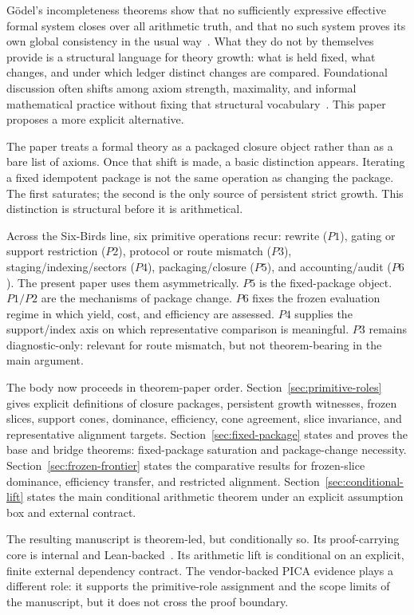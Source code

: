 \documentclass[11pt]{article}
\begin{document}
G\"odel's incompleteness theorems show that no sufficiently expressive effective
formal system closes over all arithmetic truth, and that no such system proves
its own global consistency in the usual way~\cite{Godel1931,HilbertBernays1939}. What they do not by
themselves provide is a structural language for theory growth: what is held
fixed, what changes, and under which ledger distinct changes are compared.
Foundational discussion often shifts among axiom strength, maximality, and
informal mathematical practice without fixing that structural
vocabulary~\cite{Maddy1988,SteelMaximizeUnify}. This paper proposes a more explicit
alternative.

The paper treats a formal theory as a packaged closure object rather than as a
bare list of axioms. Once that shift is made, a basic distinction appears.
Iterating a fixed idempotent package is not the same operation as changing the
package. The first saturates; the second is the only source of persistent strict
growth. This distinction is structural before it is arithmetical.

Across the Six-Birds line, six primitive operations recur: rewrite (\(P1\)),
gating or support restriction (\(P2\)), protocol or route mismatch (\(P3\)),
staging/indexing/sectors (\(P4\)), packaging/closure (\(P5\)), and
accounting/audit (\(P6\)). The present paper uses them asymmetrically. \(P5\) is
the fixed-package object. \(P1/P2\) are the mechanisms of package change. \(P6\)
fixes the frozen evaluation regime in which yield, cost, and efficiency are
assessed. \(P4\) supplies the support/index axis on which representative
comparison is meaningful. \(P3\) remains diagnostic-only: relevant for route
mismatch, but not theorem-bearing in the main argument.

The body now proceeds in theorem-paper order. Section~\ref{sec:primitive-roles}
gives explicit definitions of closure packages, persistent growth witnesses,
frozen slices, support cones, dominance, efficiency, cone agreement, slice
invariance, and representative alignment targets. Section~\ref{sec:fixed-package}
states and proves the base and bridge theorems: fixed-package saturation and
package-change necessity. Section~\ref{sec:frozen-frontier} states the
comparative results for frozen-slice dominance, efficiency transfer, and
restricted alignment. Section~\ref{sec:conditional-lift} states the main
conditional arithmetic theorem under an explicit assumption box and external
contract.

The resulting manuscript is theorem-led, but conditionally so. Its proof-carrying
core is internal and Lean-backed~\cite{deMouraUllrich2021,Mathlib2020}. Its arithmetic lift is conditional on an
explicit, finite external dependency contract. The vendor-backed PICA evidence
plays a different role: it supports the primitive-role assignment and the scope
limits of the manuscript, but it does not cross the proof boundary.
\end{document}
